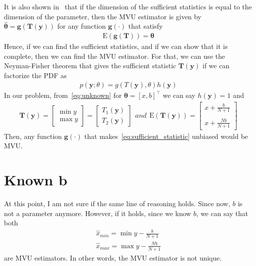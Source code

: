 \documentclass{article}
\newcommand{\E}{\mathrm{E}}
\begin{document}
It is also shown in~\cite{book:ET_kay_93} that if the dimension of the sufficient statistics is equal to the dimension of the parameter, then the MVU estimator is given by $\hat{\bm{\theta}}=\bm{g}(\bm{T}(\bm{y}))$ for any function $\bm{g}(\cdot)$ that satisfy
%
%
\begin{align}
\E(\bm{g}(\bm{T})) = \bm{\theta}
\end{align}
%
%
Hence, if we can find the sufficient statistics, and if we can show that it is complete, then we can find the MVU estimator. For that, we can use the Neyman-Fisher theorem that gives the sufficient statistic $\bm{T}(\bm{y})$ if we can factorize the PDF as 
%
%
\begin{align}
p(\bm{y};\theta) = g(T(\bm{y}),\theta)h(\bm{y})
\end{align}
%
%
In our problem, from~\eqref{eq:unknown} for $\bm{\theta}=[x,b]^\top$ we can say $h(\bm{y})=1$ and 
%
%
\begin{subequations}\label{eq:sufficient_statistic}
	\begin{align}
	\bm{T}(\bm{y}) = \begin{bmatrix}
	\min y \\ \max y
	\end{bmatrix} = \begin{bmatrix}
	T_1(\bm{y}) \\ T_2(\bm{y})
	\end{bmatrix}
	\end{align}
	and
	\begin{align}
	\E(\bm{T}(\bm{y})) = \begin{bmatrix}
	x+\frac{b}{N+1}\\\\x+\frac{Nb}{N+1}
	\end{bmatrix}
	\end{align}
\end{subequations}
%
%
Then, any function $\bm{g}(\cdot)$ that makes~\eqref{eq:sufficient_statistic} unbiased would be MVU. 
\section{Known b}
At this point, I am not sure if the same line of reasoning holds. Since now, $b$ is not a parameter anymore. However, if it holds, since we know $b$, we can say that both
%
%
\begin{align}
\hat{x}_{min} = \min y - \frac{b}{N+1}\\
\hat{x}_{max} = \max y - \frac{Nb}{N+1}
\end{align}
%
%
are MVU estimators. In other words, the MVU estimator is not unique.
\end{document}
